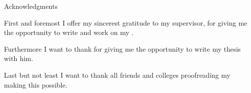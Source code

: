 \thispagestyle{empty}

\vspace*{20mm}

\begin{center}
{ Acknowledgments}
\end{center}

\vspace{10mm}

\noindent First and foremost I offer my sincerest gratitude to my supervisor, \getSupervisor{} for giving me the opportunity
to write and work on my \getDoctypeShort{}.

Furthermore I want to thank \getSupervisor{} for giving me the opportunity to write my thesis with him.

Last but not least I want to thank all friends and colleges proofreading my \getDoctypeShort{} making this possible.

\cleardoublepage{}
